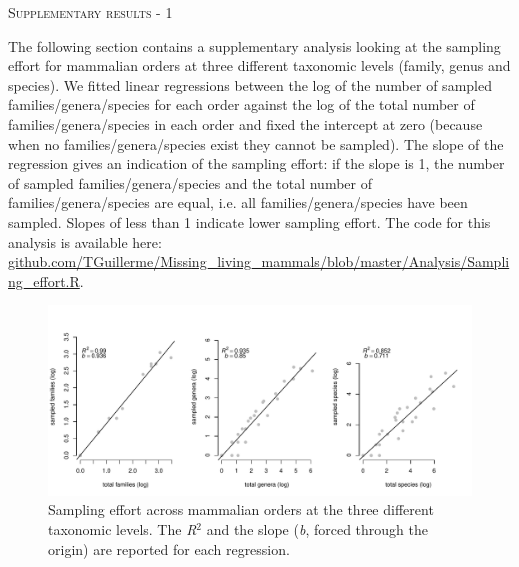 \documentclass[12pt,letterpaper]{article}
\renewcommand{\section}[1]{%
\bigskip
\begin{center}
\begin{Large}
\normalfont\scshape #1
\medskip
\end{Large}
\end{center}}
\begin{document}
\section{Supplementary results - 1}
The following section contains a supplementary analysis looking at the sampling effort for mammalian orders at three different taxonomic levels (family, genus and species).
We fitted linear regressions %
between the log of the number of sampled families/genera/species for each order against the log of the total number of families/genera/species in each order %
and fixed the intercept at zero (because when no families/genera/species exist they cannot be sampled).
The slope of the regression gives an indication of the sampling effort: if the slope is 1, the number of sampled families/genera/species and the total number of families/genera/species are equal, i.e. all families/genera/species have been sampled. 
Slopes of less than 1 indicate lower sampling effort.
The code for this analysis is available here: \url{github.com/TGuillerme/Missing_living_mammals/blob/master/Analysis/Sampling_effort.R}.

\begin{figure}[!htbp]
\centering
    \includegraphics[width=1\textwidth]{Supp_figure_sampling_effort.pdf}
\caption{Sampling effort across mammalian orders at the three different taxonomic levels. The \textit{R$^2$} and the slope (\textit{b}, forced through the origin) are reported for each regression.} %
\label{Supp_Figure_sampling}
\end{figure}

\end{document}
